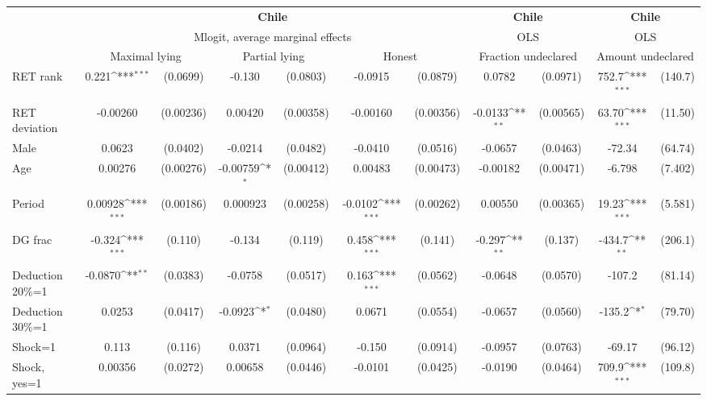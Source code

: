 \def\sym#1{\ifmmode^{#1}\else\(^{#1}\)\fi}
\begin{tabular}{l|cccccc|cc|cc}
\hline\hline
&\multicolumn{6}{c|}{\bf Chile}&\multicolumn{2}{c|}{\bf Chile}&\multicolumn{2}{c}{\bf Chile}\\ &\multicolumn{6}{c|}{Mlogit, average marginal effects }&\multicolumn{2}{c|}{OLS}&\multicolumn{2}{c}{OLS}\\
                &\multicolumn{2}{c}{Maximal lying}&\multicolumn{2}{c}{Partial lying}&\multicolumn{2}{c}{Honest}  &\multicolumn{2}{c}{Fraction undeclared}&\multicolumn{2}{c}{Amount undeclared}\\
\hline
RET rank        &    0.221\sym{***}& (0.0699)&   -0.130         & (0.0803)&  -0.0915         & (0.0879)&   0.0782         & (0.0971)&    752.7\sym{***}&  (140.7)\\
RET deviation   & -0.00260         &(0.00236)&  0.00420         &(0.00358)& -0.00160         &(0.00356)&  -0.0133\sym{**} &(0.00565)&    63.70\sym{***}&  (11.50)\\
Male            &   0.0623         & (0.0402)&  -0.0214         & (0.0482)&  -0.0410         & (0.0516)&  -0.0657         & (0.0463)&   -72.34         &  (64.74)\\
Age             &  0.00276         &(0.00276)& -0.00759\sym{*}  &(0.00412)&  0.00483         &(0.00473)& -0.00182         &(0.00471)&   -6.798         &  (7.402)\\
Period          &  0.00928\sym{***}&(0.00186)& 0.000923         &(0.00258)&  -0.0102\sym{***}&(0.00262)&  0.00550         &(0.00365)&    19.23\sym{***}&  (5.581)\\
DG frac         &   -0.324\sym{***}&  (0.110)&   -0.134         &  (0.119)&    0.458\sym{***}&  (0.141)&   -0.297\sym{**} &  (0.137)&   -434.7\sym{**} &  (206.1)\\
Deduction 20\%=1&  -0.0870\sym{**} & (0.0383)&  -0.0758         & (0.0517)&    0.163\sym{***}& (0.0562)&  -0.0648         & (0.0570)&   -107.2         &  (81.14)\\
Deduction 30\%=1&   0.0253         & (0.0417)&  -0.0923\sym{*}  & (0.0480)&   0.0671         & (0.0554)&  -0.0657         & (0.0560)&   -135.2\sym{*}  &  (79.70)\\
Shock=1         &    0.113         &  (0.116)&   0.0371         & (0.0964)&   -0.150         & (0.0914)&  -0.0957         & (0.0763)&   -69.17         &  (96.12)\\
Shock, yes=1    &  0.00356         & (0.0272)&  0.00658         & (0.0446)&  -0.0101         & (0.0425)&  -0.0190         & (0.0464)&    709.9\sym{***}&  (109.8)\\

\end{tabular}
